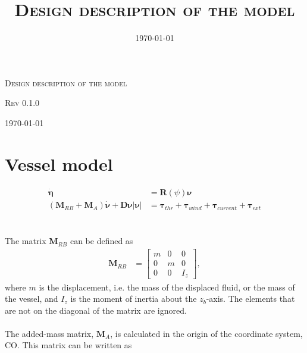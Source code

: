 \documentclass[a4paper]{article}
\title{\textsc{Design description of the model}}
\date{\today}
\begin{document}
\begin{titlepage}
	\centering
	{\scshape\LARGE Design description of the model \par}
	\vspace{1cm}
	{\scshape\Large Rev 0.1.0 \par}
	\vspace{2cm}
	\vfill

	{\large \today\par}
\end{titlepage}

\thispagestyle{empty}
\newpage

\setcounter{tocdepth}{3}
\tableofcontents
\setcounter{secnumdepth}{3}
\newpage

\section{Vessel model}

\begin{equation}
\label{eq:vessel_model}
\begin{aligned}
	\boldsymbol{\dot{\eta}} &= \boldsymbol{R} (\psi) \boldsymbol{\nu} \\
	(\boldsymbol{M}_{RB} + \boldsymbol{M}_A) \boldsymbol{\dot{\nu}} + \boldsymbol{D} \boldsymbol{\nu} |\boldsymbol{\nu}| &= \boldsymbol{\tau}_{thr} + \boldsymbol{\tau}_{wind} + \boldsymbol{\tau}_{current} + \boldsymbol{\tau}_{ext}
\end{aligned}
\end{equation}
\\
\\
The matrix $\boldsymbol{M}_{RB}$ can be defined as
\begin{equation}
\label{eq:MRB_matrix}
\begin{aligned}
	\boldsymbol{M}_{RB} &=
		\left[ \begin{array}{ccc}
			m &  0 & 0 \\
			0 &  m & 0 \\
			0 &  0 &  I_z 
		\end{array} \right],
\end{aligned}
\end{equation}
%
where $m$ is the displacement, i.e. the mass of the displaced fluid, or the mass of the vessel, and $I_z$ is the moment of inertia about the $z_b$-axis. The elements that are not on
the diagonal of the matrix are ignored.
\\
\\
The added-mass matrix, $\boldsymbol{M}_A$, is calculated in the origin of the coordinate system, CO. This matrix can be written as
\end{document}

